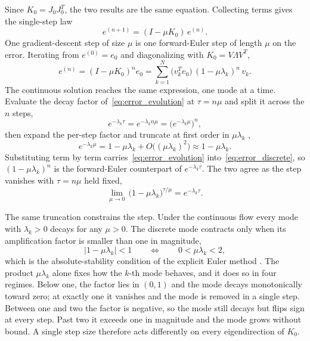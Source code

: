 Since $K_0 = J_0 J_0^T$, the two results are the same equation. Collecting terms gives the single-step law
\begin{equation}\label{eq:error_discrete_step}
    e^{(n+1)} = (I - \mu K_0)\,e^{(n)}.
\end{equation}
One gradient-descent step of size $\mu$ is one forward-Euler step of length $\mu$ on the error. Iterating from $e^{(0)} = e_0$ and diagonalizing with $K_0 = V\Lambda V^T$,
\begin{equation}\label{eq:error_discrete}
    e^{(n)} = (I - \mu K_0)^n e_0 = \sum_{k=1}^N \bigl(v_k^T e_0\bigr)\,(1 - \mu\lambda_k)^n\,v_k.
\end{equation}
The continuous solution reaches the same expression, one mode at a time. Evaluate the decay factor of~\eqref{eq:error_evolution} at $\tau = n\mu$ and split it across the $n$ steps,
\[
    e^{-\lambda_k\tau} = e^{-\lambda_k n\mu} = \bigl(e^{-\lambda_k\mu}\bigr)^n,
\]
then expand the per-step factor and truncate at first order in $\mu\lambda_k$ \parencite{burden2011},
\begin{equation}\label{eq:euler_truncation}
    e^{-\lambda_k\mu} = 1 - \mu\lambda_k + O\bigl((\mu\lambda_k)^2\bigr) \approx 1 - \mu\lambda_k.
\end{equation}
Substituting term by term carries~\eqref{eq:error_evolution} into~\eqref{eq:error_discrete}, so $(1-\mu\lambda_k)^n$ is the forward-Euler counterpart of $e^{-\lambda_k\tau}$. The two agree as the step vanishes with $\tau = n\mu$ held fixed,
\[
    \lim_{\mu \to 0}\, \bigl(1 - \mu\lambda_k\bigr)^{\tau/\mu} = e^{-\lambda_k\tau}.
\]

The same truncation constrains the step. Under the continuous flow every mode with $\lambda_k > 0$ decays for any $\mu > 0$. The discrete mode contracts only when its amplification factor is smaller than one in magnitude,
\begin{equation*}
    \bigl| 1 - \mu\lambda_k \bigr| < 1
    \qquad\Longleftrightarrow\qquad
    0 < \mu\lambda_k < 2,
\end{equation*}
which is the absolute-stability condition of the explicit Euler method \parencite{leveque2007, suli2003}. The product $\mu\lambda_k$ alone fixes how the $k$-th mode behaves, and it does so in four regimes. Below one, the factor lies in $(0,1)$ and the mode decays monotonically toward zero; at exactly one it vanishes and the mode is removed in a single step. Between one and two the factor is negative, so the mode still decays but flips sign at every step. Past two it exceeds one in magnitude and the mode grows without bound. A single step size therefore acts differently on every eigendirection of $K_0$.

